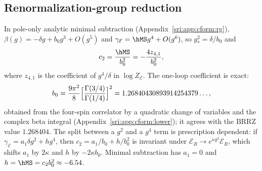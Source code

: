 \subsection{Renormalization-group reduction}\label{sri:sec:rg2}
In pole-only analytic minimal subtraction (Appendix~\ref{sri:app:cform:rg}), $\beta(g)=-\delta g+b_0g^3+O(g^5)$ and
$\gamma_{\mathcal E}=\hMS g^4+O(g^6)$, so $g_*^2=\delta/b_0$ and
\begin{equation}
 c_2=\frac{\hMS}{b_0^2}=-\frac{4z_{4,1}}{b_0^2},
\end{equation}
where $z_{4,1}$ is the coefficient of $g^4/\delta$ in $\log Z_{\mathcal E}$. The one-loop coefficient is exact:
\begin{equation}
 b_0=\frac{9\pi^2}{8}\Bigl[\frac{\Gamma(3/4)}{\Gamma(1/4)}\Bigr]^2=1.26840430893914254379\ldots,
\end{equation}
obtained from the four-spin correlator by a quadratic change of variables and the complex beta integral
(Appendix~\ref{sri:app:cform:lower}); it agrees
with the BRRZ value $1.268404$. The split between a $g^2$ and a $g^4$ term is prescription dependent: if
$\gamma_{\mathcal E}=a_1\delta g^2+hg^4$, then $c_2=a_1/b_0+h/b_0^2$ is invariant under
$\mathcal E_R\to e^{\kappa g^2}\mathcal E_R$, which shifts $a_1$ by $2\kappa$ and $h$ by $-2\kappa b_0$. Minimal
subtraction has $a_1=0$ and $h=\hMS=c_2b_0^2\approx-6.54$.

